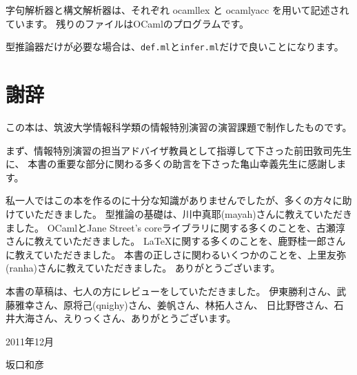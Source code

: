 字句解析器と構文解析器は、それぞれ ocamllex と ocamlyacc を用いて記述されています。
残りのファイルはOCamlのプログラムです。

型推論器だけが必要な場合は、\texttt{def.ml}と\texttt{infer.ml}だけで良いことになります。

\section*{謝辞}

この本は、筑波大学情報科学類の情報特別演習の演習課題で制作したものです。

まず、情報特別演習の担当アドバイザ教員として指導して下さった前田敦司先生に、
本書の重要な部分に関わる多くの助言を下さった亀山幸義先生に感謝します。

私一人ではこの本を作るのに十分な知識がありませんでしたが、多くの方々に助けていただきました。
型推論の基礎は、川中真耶(mayah)さんに教えていただきました。
OCamlとJane Street's coreライブラリに関する多くのことを、古瀬淳さんに教えていただきました。
\LaTeX{}に関する多くのことを、鹿野桂一郎さんに教えていただきました。
本書の正しさに関わるいくつかのことを、上里友弥(ranha)さんに教えていただきました。
ありがとうございます。

本書の草稿は、七人の方にレビューをしていただきました。
伊東勝利さん、武藤雅幸さん、原将己(qnighy)さん、姜帆さん、林拓人さん、
日比野啓さん、石井大海さん、えりっくさん、ありがとうございます。

\begin{flushright}
2011年12月

坂口和彦
\end{flushright}

